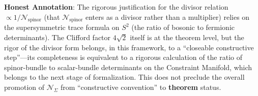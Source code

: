 \documentclass[aps,prd,reprint,nofootinbib]{revtex4-2}
\begin{document}
\textbf{Honest Annotation}: The rigorous justification for the divisor relation $\propto 1/\mathcal{N}_{\text{spinor}}$ (that $\mathcal{N}_{\text{spinor}}$ enters as a divisor rather than a multiplier) relies on the supersymmetric trace formula on $S^2$ (the ratio of bosonic to fermionic determinants). The Clifford factor $4\sqrt{2}$ itself is at the theorem level, but the rigor of the divisor form belongs, in this framework, to a ``closeable constructive step''---its completeness is equivalent to a rigorous calculation of the ratio of spinor-bundle to scalar-bundle determinants on the Constraint Manifold, which belongs to the next stage of formalization. This does not preclude the overall promotion of $\mathcal{N}_\Sigma$ from ``constructive convention'' to \textbf{theorem} status.

\end{document}
